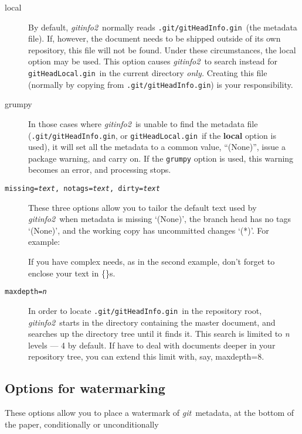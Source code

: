 \documentclass[a4paper,12pt,twoside,openany]{memoir}
\newcommand{\sfit}[1]{\textit{#1}}
\newcommand{\git}{\sfit{git}}
\newcommand{\tpname}{\sfit{gitinfo2}}
\newcommand{\ginname}{gitHeadInfo.gin}
\newcommand{\locname}{\texttt{gitHeadLocal.gin}}
\newcommand{\metapath}{\texttt{.git/\ginname}}
\begin{document}
\begin{description}

\item[local]
By default, \tpname\ normally reads \metapath\ (the metadata file).
If, however, the document needs to be shipped outside of its own repository,
this file will not be found.
Under these circumstances, the {\ttfamily local} option may be used.
This option causes \tpname\ to search
instead for \locname\ in the current directory \emph{only.}
Creating this file
(normally by copying from \metapath) is your responsibility.

\item[grumpy]
In those cases where \tpname\ is unable to find the metadata file 
(\metapath{}, or \locname\ if the {\ttfamily\bfseries local} option is used),
it will set all the metadata to a common value, ``(None)'',
issue a package warning, and carry on.
If the \texttt{grumpy} option is used,
this warning becomes an error, and processing stops.

\item[\texttt{missing=\textit{text}, notags=\textit{text}, dirty=\textit{text}}]
These three options allow you to tailor the default text used by \tpname\ when
metadata is missing `(None)',
the branch head has no tags `(None)',
and the working copy has uncommitted changes `(*)'.
For example:

\begin{quote}
{\ttfamily
[missing=Help!,notags=\{No\,tags?\},dirty=Eww!]
}
\end{quote}
If you have complex needs, as in the second example,
don't forget to enclose your text in \{\}s.

\item[\texttt{maxdepth=\textit{n}}]
In order to locate \metapath\ in the repository root,
\tpname\ starts in the directory containing the master document,
and searches up the directory tree until it finds it.
This search is limited to {\ttfamily\itshape n} levels --- 4 by default.
If have to deal with documents
deeper in your repository tree, you can extend this limit with, say,
{\ttfamily maxdepth=8}.

\end{description}
\clearpage
\subsection{Options for watermarking}

These options allow you to place a watermark of \git\ metadata,
at the bottom of the paper, conditionally or unconditionally
\end{document}
